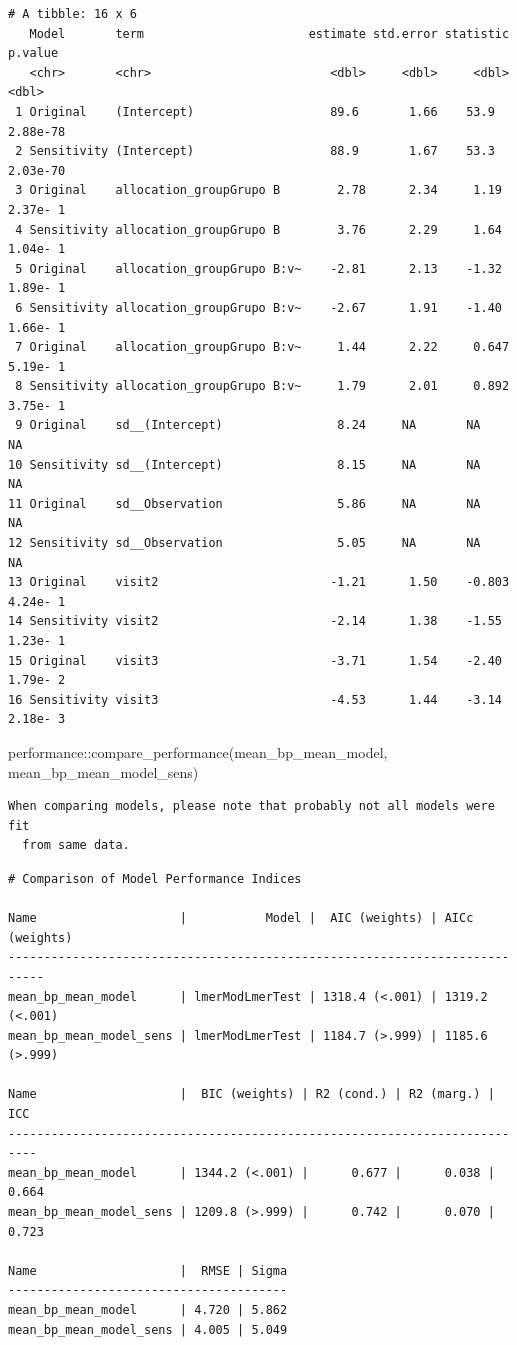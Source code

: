 \documentclass[
  letterpaper,
  DIV=11,
  numbers=noendperiod]{scrartcl}
\newenvironment{Shaded}{\begin{snugshade}}{\end{snugshade}}
\newcommand{\FunctionTok}[1]{\textcolor[rgb]{0.28,0.35,0.67}{#1}}
\newcommand{\NormalTok}[1]{\textcolor[rgb]{0.00,0.23,0.31}{#1}}
\newcommand{\SpecialCharTok}[1]{\textcolor[rgb]{0.37,0.37,0.37}{#1}}
\begin{document}
\begin{verbatim}
# A tibble: 16 x 6
   Model       term                       estimate std.error statistic   p.value
   <chr>       <chr>                         <dbl>     <dbl>     <dbl>     <dbl>
 1 Original    (Intercept)                   89.6       1.66    53.9    2.88e-78
 2 Sensitivity (Intercept)                   88.9       1.67    53.3    2.03e-70
 3 Original    allocation_groupGrupo B        2.78      2.34     1.19   2.37e- 1
 4 Sensitivity allocation_groupGrupo B        3.76      2.29     1.64   1.04e- 1
 5 Original    allocation_groupGrupo B:v~    -2.81      2.13    -1.32   1.89e- 1
 6 Sensitivity allocation_groupGrupo B:v~    -2.67      1.91    -1.40   1.66e- 1
 7 Original    allocation_groupGrupo B:v~     1.44      2.22     0.647  5.19e- 1
 8 Sensitivity allocation_groupGrupo B:v~     1.79      2.01     0.892  3.75e- 1
 9 Original    sd__(Intercept)                8.24     NA       NA     NA       
10 Sensitivity sd__(Intercept)                8.15     NA       NA     NA       
11 Original    sd__Observation                5.86     NA       NA     NA       
12 Sensitivity sd__Observation                5.05     NA       NA     NA       
13 Original    visit2                        -1.21      1.50    -0.803  4.24e- 1
14 Sensitivity visit2                        -2.14      1.38    -1.55   1.23e- 1
15 Original    visit3                        -3.71      1.54    -2.40   1.79e- 2
16 Sensitivity visit3                        -4.53      1.44    -3.14   2.18e- 3
\end{verbatim}

\begin{Shaded}
\begin{Highlighting}[]
\NormalTok{performance}\SpecialCharTok{::}\FunctionTok{compare\_performance}\NormalTok{(mean\_bp\_mean\_model, mean\_bp\_mean\_model\_sens)}
\end{Highlighting}
\end{Shaded}

\begin{verbatim}
When comparing models, please note that probably not all models were fit
  from same data.
\end{verbatim}

\begin{verbatim}
# Comparison of Model Performance Indices

Name                    |           Model |  AIC (weights) | AICc (weights)
---------------------------------------------------------------------------
mean_bp_mean_model      | lmerModLmerTest | 1318.4 (<.001) | 1319.2 (<.001)
mean_bp_mean_model_sens | lmerModLmerTest | 1184.7 (>.999) | 1185.6 (>.999)

Name                    |  BIC (weights) | R2 (cond.) | R2 (marg.) |   ICC
--------------------------------------------------------------------------
mean_bp_mean_model      | 1344.2 (<.001) |      0.677 |      0.038 | 0.664
mean_bp_mean_model_sens | 1209.8 (>.999) |      0.742 |      0.070 | 0.723

Name                    |  RMSE | Sigma
---------------------------------------
mean_bp_mean_model      | 4.720 | 5.862
mean_bp_mean_model_sens | 4.005 | 5.049
\end{verbatim}
\end{document}
